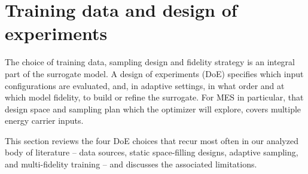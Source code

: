 \section{Training data and design of experiments}
\label{sec:doe}

The choice of training data, sampling design and fidelity strategy is an
integral part of the surrogate model. A design of experiments (DoE)
specifies which input configurations are evaluated, and, in adaptive
settings, in what order and at which model fidelity, to build or refine
the surrogate. For MES in particular, that design space and sampling
plan which the optimizer will explore, covers multiple energy carrier
inputs.

This section reviews the four DoE choices that recur most often in our
analyzed body of literature -- data sources, static space-filling
designs, adaptive sampling, and multi-fidelity training -- and discusses
the associated limitations.

